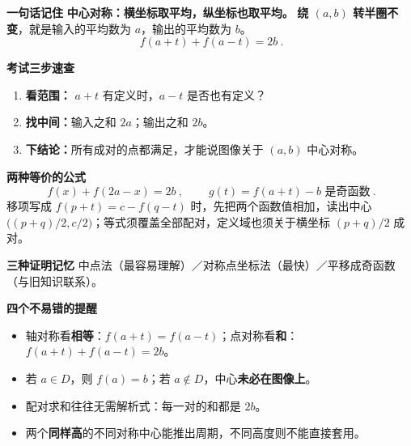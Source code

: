 \clearpage
\begin{summarybox}
\textbf{\textcolor{CSummary}{一句话记住}}\quad
\textbf{中心对称：横坐标取平均，纵坐标也取平均。}
\textbf{绕 $(a,b)$ 转半圈不变}，就是输入的平均数为 $a$，输出的平均数为 $b$。
\[
\boxed{\ f(a+t)+f(a-t)=2b\ }.
\]

\textbf{\textcolor{CSummary}{考试三步速查}}
\begin{enumerate}[leftmargin=*,itemsep=0.2em]
\item \textbf{看范围：} $a+t$ 有定义时，$a-t$ 是否也有定义？
\item \textbf{找中间：}输入之和 $2a$；输出之和 $2b$。
\item \textbf{下结论：}所有成对的点都满足，才能说图像关于 $(a,b)$ 中心对称。
\end{enumerate}

\textbf{\textcolor{CSummary}{两种等价的公式}}
\[
\boxed{\ f(x)+f(2a-x)=2b\ },\qquad
\boxed{\ g(t)=f(a+t)-b\text{ 是奇函数}\ }.
\]
移项写成 $f(p+t)=c-f(q-t)$ 时，先把两个函数值相加，读出中心 $\bigl((p+q)/2,c/2\bigr)$；等式须覆盖全部配对，定义域也须关于横坐标 $(p+q)/2$ 成对。

\textbf{\textcolor{CSummary}{三种证明记忆}}\quad
中点法（最容易理解）／对称点坐标法（最快）／平移成奇函数（与旧知识联系）。

\textbf{\textcolor{CSummary}{四个不易错的提醒}}
\begin{itemize}[leftmargin=*,itemsep=0.2em]
\item 轴对称看\textbf{相等}：$f(a+t)=f(a-t)$；点对称看\textbf{和}：$f(a+t)+f(a-t)=2b$。
\item 若 $a\in D$，则 $f(a)=b$；若 $a\notin D$，中心\textbf{未必在图像上}。
\item 配对求和往往无需解析式：每一对的和都是 $2b$。
\item 两个\textbf{同样高}的不同对称中心能推出周期，不同高度则不能直接套用。
\end{itemize}
\end{summarybox}
